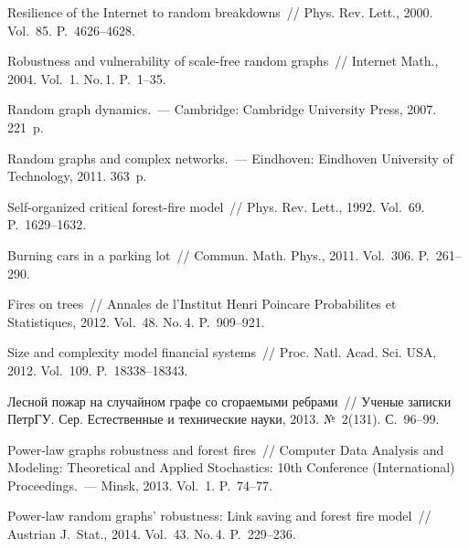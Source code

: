 \begin{multicols}{2}
\vspace*{-4pt}

{\small\frenchspacing
 {%
 \begin{thebibliography}{99}
 
 \vspace*{-1pt}
 
Resilience of the Internet to random breakdowns~// Phys. Rev. Lett.,
2000. Vol.~85. P.~4626--4628.

 Robustness and vulnerability of
scale-free random graphs~// Internet Math., 2004. Vol.~1.
No.\,1. P.~1--35.



 Random graph dynamics.~--- Cambridge: Cambridge University
Press, 2007. 221~p.

 Random graphs and complex networks.~--- Eindhoven:
Eindhoven University of Technology, 2011. 363~p.

 Self-organized critical forest-fire
model~// Phys. Rev. Lett., 1992. Vol.~69. P.~1629--1632.

 Burning cars in a parking lot~// Commun. Math.
Phys., 2011. Vol.~306. P.~261--290.

 Fires on trees~// Annales de l'Institut Henri
Poincare Probabilites et Statistiques, 2012. Vol.~48. No.\,4.
P.~909--921.

 Size and complexity
model financial systems~// Proc. Natl. Acad. Sci.
USA, 2012. Vol.~109. P.~18338--18343.

 Лесной пожар на случайном
графе со сгораемыми реб\-ра\-ми~// Ученые записки ПетрГУ. Сер.
Естественные и технические науки, 2013. №~2(131). С.~96--99.

 Power-law graphs robustness and forest
fires~// Computer Data Analysis and Modeling: Theoretical and
Applied Stochastics:  10th
Conference (International) Proceedings.~--- Minsk, 2013. Vol.~1. P.~74--77.

 Power-law random graphs' robustness:
Link saving and forest fire model~// Austrian J.~Stat.,
2014. Vol.~43. No.\,4. P.~229--236.


\end{thebibliography}}}
\end{multicols}
